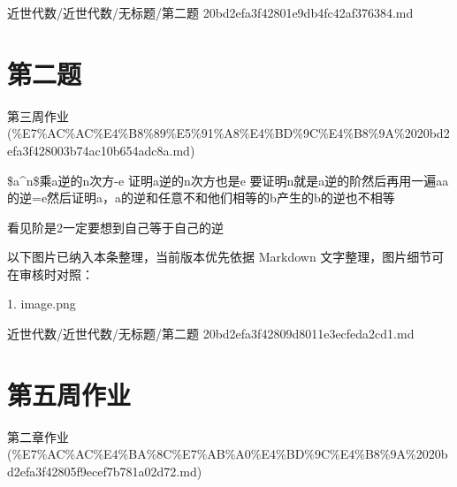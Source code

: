 \begin{note}[来源路径]

近世代数/近世代数/无标题/第二题 20bd2efa3f42801e9db4fc42af376384.md

\end{note}

\section*{第二题}

\begin{note}[来源上级主题]

第三周作业 (\%E7\%AC\%AC\%E4\%B8\%89\%E5\%91\%A8\%E4\%BD\%9C\%E4\%B8\%9A\%2020bd2efa3f428003b74ac10b654adc8a.md)

\end{note}

\begin{homework}

\$a\textasciicircum{}n\$乘a逆的n次方-e 证明a逆的n次方也是e 要证明n就是a逆的阶然后再用一遍aa的逆=e然后证明a，a的逆和任意不和他们相等的b产生的b的逆也不相等

看见阶是2一定要想到自己等于自己的逆

\end{homework}

\begin{note}[关联图片]
以下图片已纳入本条整理，当前版本优先依据 Markdown 文字整理，图片细节可在审核时对照：

1. image.png\\

\end{note}

\begin{note}[来源路径]

近世代数/近世代数/无标题/第二题 20bd2efa3f42809d8011e3ecfeda2cd1.md

\end{note}

\section*{第五周作业}

\begin{note}[来源上级主题]

第二章作业 (\%E7\%AC\%AC\%E4\%BA\%8C\%E7\%AB\%A0\%E4\%BD\%9C\%E4\%B8\%9A\%2020bd2efa3f42805f9ecef7b781a02d72.md)

\end{note}

